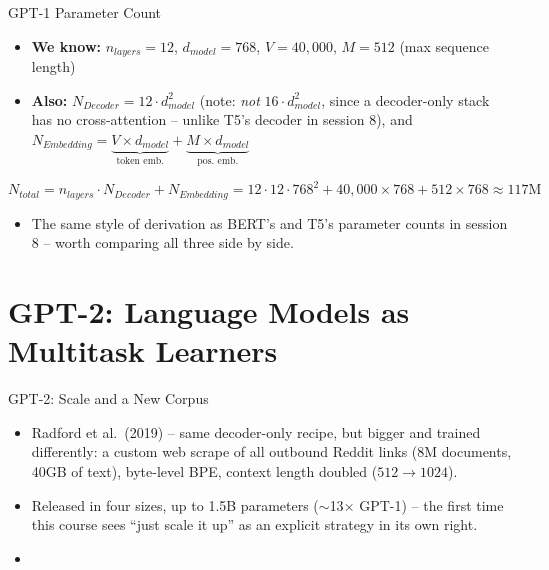 \begin{vbframe}{GPT-1 Parameter Count}
\begin{itemize}
  \item \textbf{We know:} $n_{layers}=12$, $d_{model}=768$, $V=40{,}000$, $M=512$ (max sequence length)
  \item \textbf{Also:} $N_{Decoder} = 12\cdot d_{model}^2$ (note: \textit{not} $16\cdot d_{model}^2$, since a decoder-only stack has no cross-attention -- unlike T5's decoder in session 8), and\\
  $N_{Embedding} = \underbrace{V\times d_{model}}_{\text{token emb.}} + \underbrace{M\times d_{model}}_{\text{pos.\ emb.}}$
\end{itemize}
$$
N_{total} = n_{layers}\cdot N_{Decoder} + N_{Embedding} = 12\cdot 12\cdot 768^2 + 40{,}000\times 768 + 512\times 768 \approx 117\text{M}
$$
\begin{itemize}
  \item The same style of derivation as BERT's and T5's parameter counts in session 8 -- worth comparing all three side by side.
\end{itemize}
\end{vbframe}


\section{GPT-2: Language Models as Multitask Learners}

\begin{vbframe}{GPT-2: Scale and a New Corpus}
\begin{itemize}
  \item Radford et al.\ (2019) -- same decoder-only recipe, but bigger and trained differently: a custom web scrape of all outbound Reddit links (8M documents, 40GB of text), byte-level BPE, context length doubled ($512\to1024$).
  \item Released in four sizes, up to 1.5B parameters ($\sim$13$\times$ GPT-1) -- the first time this course sees ``just scale it up'' as an explicit strategy in its own right.
  \item {}
\end{itemize}
\end{vbframe}

